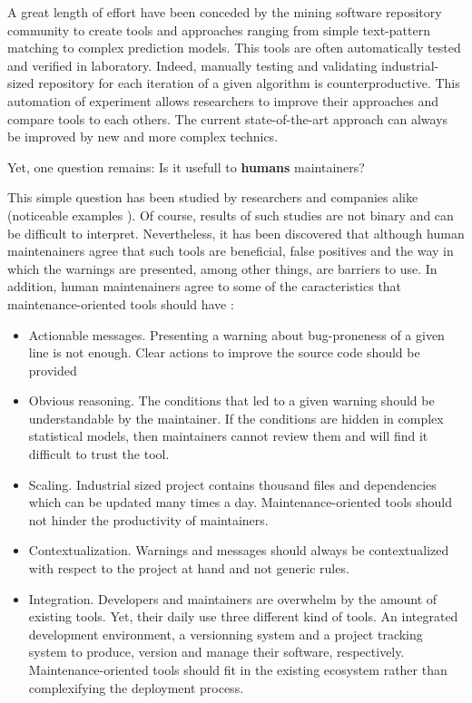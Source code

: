 A great length of effort have been conceded by the mining software repository community to create tools and approaches ranging from simple text-pattern matching to complex prediction models.
This tools are often automatically tested and verified in laboratory\cite{Lewis2013}.
Indeed, manually testing and validating industrial-sized repository for each iteration of a given algorithm is counterproductive.
This automation of experiment allows researchers to improve their approaches and compare tools to each others.
The current state-of-the-art approach can always be improved by new and more complex technics\cite{Hovemeyer2004}.

Yet, one question remains:  Is it usefull to {\bf humans} maintainers?

This simple question has been studied by researchers and companies alike (noticeable examples \cite{Lewis2013,Foss2015,Layman2007,Ayewah2007,Ayewah2008,Johnson2013,Norman2013, Lopez2011}).
Of course, results of such studies are not binary and can be difficult to interpret.
Nevertheless, it has been discovered that although human maintenainers agree that such tools are beneficial, false positives and the way in which the warnings are presented, among other things, are barriers to use\cite{Johnson2013}.
In addition, human maintenainers agree to some of the caracteristics that maintenance-oriented tools should have \cite{Hovemeyer2004, Lopez2011, Lewis2013}:

\begin{itemize}
	\item Actionable messages. Presenting a warning about bug-proneness of a given line is not enough.
	Clear actions to improve the source code should be provided
	\item Obvious reasoning. The conditions that led to a given warning should be understandable by the maintainer.
	If the conditions are hidden in complex statistical models, then maintainers cannot review them and will find it difficult to trust the tool.
	\item Scaling. Industrial sized project contains thousand files and dependencies which can be updated many times a day.
	Maintenance-oriented tools should not hinder the productivity of maintainers.
	\item Contextualization. Warnings and messages should always be contextualized with respect to the project at hand and not generic rules.
	\item Integration. Developers and maintainers are overwhelm by the amount of existing tools.
	Yet, their daily use three different kind of tools.
	An integrated development environment, a versionning system and a project tracking system to produce, version and manage their software, respectively.
	Maintenance-oriented tools should fit in the existing ecosystem rather than complexifying the deployment process.
\end{itemize}

